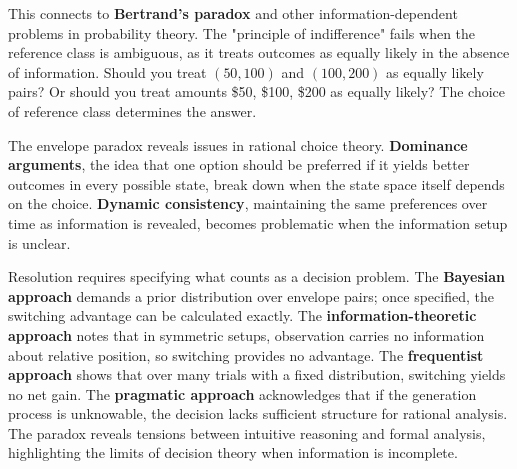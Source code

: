 This connects to \textbf{Bertrand's paradox} and other information-dependent problems in probability theory. The "principle of indifference" fails when the reference class is ambiguous, as it treats outcomes as equally likely in the absence of information. Should you treat $(50, 100)$ and $(100, 200)$ as equally likely pairs? Or should you treat amounts \$50, \$100, \$200 as equally likely? The choice of reference class determines the answer.

The envelope paradox reveals issues in rational choice theory. \textbf{Dominance arguments}, the idea that one option should be preferred if it yields better outcomes in every possible state, break down when the state space itself depends on the choice. \textbf{Dynamic consistency}, maintaining the same preferences over time as information is revealed, becomes problematic when the information setup is unclear.

Resolution requires specifying what counts as a decision problem. The \textbf{Bayesian approach} demands a prior distribution over envelope pairs; once specified, the switching advantage can be calculated exactly. The \textbf{information-theoretic approach} notes that in symmetric setups, observation carries no information about relative position, so switching provides no advantage. The \textbf{frequentist approach} shows that over many trials with a fixed distribution, switching yields no net gain. The \textbf{pragmatic approach} acknowledges that if the generation process is unknowable, the decision lacks sufficient structure for rational analysis. The paradox reveals tensions between intuitive reasoning and formal analysis, highlighting the limits of decision theory when information is incomplete.


